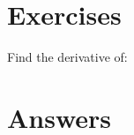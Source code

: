 \section{Exercises}
Find the derivative of:
\begin{enumerate}
\end{enumerate}
\section{Answers}
\begin{enumerate}
\end{enumerate}



